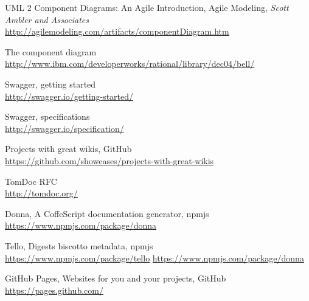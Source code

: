  UML 2 Component Diagrams: An Agile Introduction,
    \newblock Agile Modeling, \emph{Scott Ambler and Associates}\\
    \newblock \url{http://agilemodeling.com/artifacts/componentDiagram.htm}

 The component diagram\\
    \newblock \url{http://www.ibm.com/developerworks/rational/library/dec04/bell/}

 Swagger, getting started\\
    \newblock \url{http://swagger.io/getting-started/}

 Swagger, specifications\\
    \newblock \url{http://swagger.io/specification/}

 Projects with great wikis,
    \newblock GitHub\\
    \newblock \url{https://github.com/showcases/projects-with-great-wikis}

 TomDoc RFC\\
    \newblock \url{http://tomdoc.org/}

 Donna, A CoffeScript documentation generator,
    \newblock npmjs\\
    \newblock \url{https://www.npmjs.com/package/donna}

 Tello, Digests biscotto metadata,
    \newblock npmjs\\
    \newblock \url{https://www.npmjs.com/package/tello}
    \newblock \url{https://www.npmjs.com/package/donna}

 GitHub Pages, Websites for you and your projects,
    \newblock GitHub\\
    \newblock \url{https://pages.github.com/}